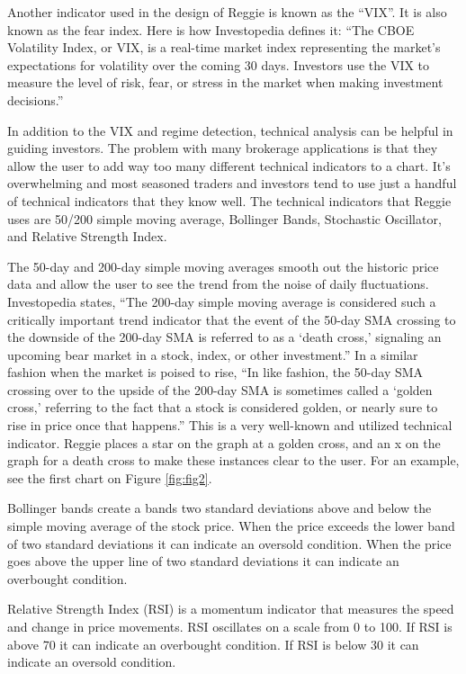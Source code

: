 \documentclass[conference]{IEEEtran}
\begin{document}
Another indicator used in the design of Reggie is known as the ``VIX''. It is also known as the fear index. Here is how Investopedia defines it: ``The CBOE Volatility Index, or VIX, is a real-time market index representing the market's expectations for volatility over the coming 30 days. Investors use the VIX to measure the level of risk, fear, or stress in the market when making investment decisions.'' \cite{b8}

In addition to the VIX and regime detection, technical analysis can be helpful in guiding investors. The problem with many brokerage applications is that they allow the user to add way too many different technical indicators to a chart. It's overwhelming and most seasoned traders and investors tend to use just a handful of technical indicators that they know well. The technical indicators that Reggie uses are 50/200 simple moving average, Bollinger Bands, Stochastic Oscillator, and Relative Strength Index. 

The 50-day and 200-day simple moving averages smooth out the historic price data and allow the user to see the trend from the noise of daily fluctuations. Investopedia states, ``The 200-day simple moving average is considered such a critically important trend indicator that the event of the 50-day SMA crossing to the downside of the 200-day SMA is referred to as a `death cross,' signaling an upcoming bear market in a stock, index, or other investment.'' In a similar fashion when the market is poised to rise, ``In like fashion, the 50-day SMA crossing over to the upside of the 200-day SMA is sometimes called a `golden cross,' referring to the fact that a stock is considered golden, or nearly sure to rise in price once that happens.'' This is a very well-known and utilized technical indicator. Reggie places a star on the graph at a golden cross, and an x on the graph for a death cross to make these instances clear to the user. For an example, see the first chart on Figure \ref{fig:fig2}. 

Bollinger bands create a bands two standard deviations above and below the simple moving average of the stock price. When the price exceeds the lower band of two standard deviations it can indicate an oversold condition. When the price goes above the upper line of two standard deviations it can indicate an overbought condition.

Relative Strength Index (RSI) is a momentum indicator that measures the speed and change in price movements. RSI oscillates on a scale from 0 to 100. If RSI is above 70 it can indicate an overbought condition. If RSI is below 30 it can indicate an oversold condition.
\end{document}
